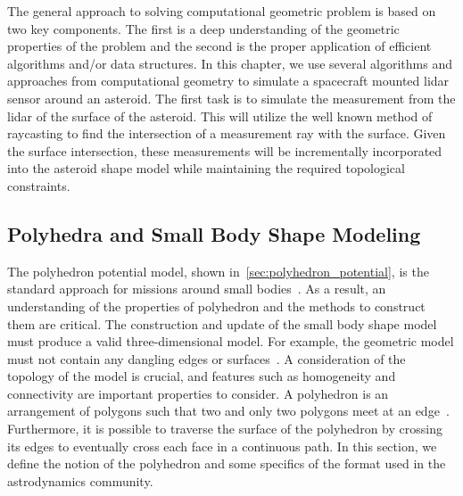 The general approach to solving computational geometric problem is based on two key components.
The first is a deep understanding of the geometric properties of the problem and the second is the proper application of efficient algorithms and/or data structures.
In this chapter, we use several algorithms and approaches from computational geometry to simulate a spacecraft mounted \gls{lidar} sensor around an asteroid.
The first task is to simulate the measurement from the \gls{lidar} of the surface of the asteroid.
This will utilize the well known method of \gls{raycasting} to find the intersection of a measurement ray with the surface.
Given the surface intersection, these measurements will be incrementally incorporated into the asteroid shape model while maintaining the required topological constraints.

\subsection{Polyhedra and Small Body Shape Modeling}\label{sec:shape_model}

The polyhedron potential model, shown in~\cref{sec:polyhedron_potential}, is the standard approach for missions around small bodies~\cite{werner1994,werner1996}.
As a result, an understanding of the properties of polyhedron and the methods to construct them are critical.
The construction and update of the small body shape model must produce a valid three-dimensional model.
For example, the geometric model must not contain any dangling edges or surfaces~\cite{mortenson1997}.
A consideration of the topology of the model is crucial, and features such as homogeneity and connectivity are important properties to consider.
A polyhedron is an arrangement of \glspl{polygon} such that two and only two polygons meet at an edge~\cite{mortenson1997}.
Furthermore, it is possible to traverse the surface of the polyhedron by crossing its edges to eventually cross each face in a continuous path.
In this section, we define the notion of the polyhedron and some specifics of the format used in the astrodynamics community.


